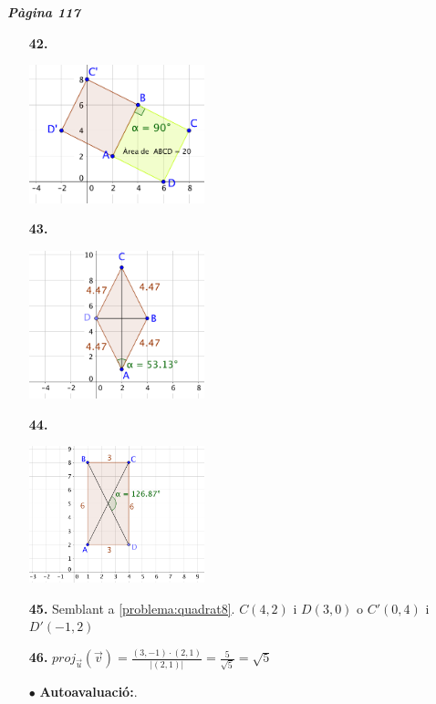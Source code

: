 \documentclass[a4paper, pdf, twoside]{book}
\begin{document}
\begin{multicols}{2}
{\textbf{\em Pàgina 117}} \hrulefill
\begin{enumerate}
\vspace{0.25cm}
\item[\fontfamily{phv}\selectfont\color{blue}\textbf{42. }] 
\mbox {}\par \includegraphics [width=0.4\textwidth ]{img-sol/t8-38}
 \end{enumerate}
\begin{enumerate}
\vspace{0.25cm}
\item[\fontfamily{phv}\selectfont\color{blue}\textbf{43. }] 
\mbox {}\par \includegraphics [width=0.4\textwidth ]{img-sol/t8-39}
\vspace{0.25cm}
\item[\fontfamily{phv}\selectfont\color{blue}\textbf{44. }] 
\mbox {}\par \includegraphics [width=0.4\textwidth ]{img-sol/t8-40}
\vspace{0.25cm}
\item[\fontfamily{phv}\selectfont\color{blue}\textbf{45. }] 
Semblant a \ref {problema:quadrat8}. $C(4,2)$ i $D(3,0)$ o $C'(0,4)$ i $D'(-1,2)$ 
\vspace{0.25cm}
\item[\fontfamily{phv}\selectfont\color{blue}\textbf{46. }] 
$proj_{\vec u} (\vec v) =\frac { (3,-1)\cdot (2,1)}{|(2,1)|}=\frac {5}{\sqrt {5}}=\sqrt {5}$ 
\vspace{0.25cm}
 \item[$\bullet$ ] {\selectfont\color{blue}\textbf{Autoavaluació:}. }


\end{enumerate}
\end{multicols}
\end{document}
